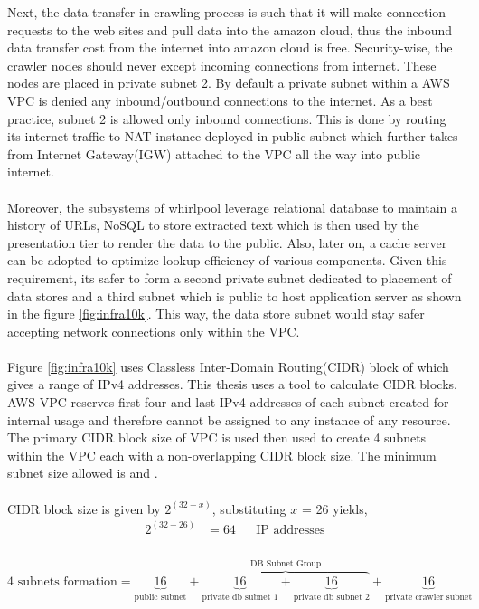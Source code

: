 \noindent
Next, the data transfer in crawling process is such that it will make connection requests to the web sites and pull data into the amazon cloud, thus the inbound data transfer cost from the internet into amazon cloud is free. Security-wise, the crawler nodes should never except incoming connections from internet. These nodes are placed in private subnet 2. By default a private subnet within a AWS VPC is denied any inbound/outbound connections to the internet. As a best practice, subnet 2 is allowed only inbound connections. This is done by routing its internet traffic to NAT instance deployed in public subnet which further takes from Internet Gateway(IGW) attached to the VPC all the way into public internet.
\\
\\
\noindent
Moreover, the subsystems of whirlpool leverage relational database to maintain a history of URLs, NoSQL to
store extracted text which is then used by the presentation tier to render the data to the public. Also,
later on, a cache server can be adopted to optimize lookup efficiency of various components. Given this
requirement, its safer to form a second private subnet dedicated to placement of data stores and a third
subnet which is public to host application server as shown in the figure \ref{fig:infra10k}. This way, the data store subnet would stay safer accepting network connections only within the VPC.
\\
\\
\noindent
Figure \ref{fig:infra10k} uses Classless Inter-Domain Routing(CIDR) block of  which
gives a range of  IPv4 addresses. This thesis uses a tool \cite{cidr} to calculate CIDR
blocks. AWS VPC reserves first four and last IPv4 addresses of each subnet created for internal usage and
therefore cannot be assigned to any instance of any resource. The primary CIDR block size of VPC is used
then used to create 4 subnets within the VPC each with a non-overlapping CIDR block size. The minimum
subnet size allowed is  and .
\\
\\
CIDR block size is given by $2^{(32 - x)}$, substituting $x$ = 26 yields,
\begin{align*}
  2^{(32 - 26)} &= 64 && \text{IP addresses} \\
\end{align*}
\\
\[
\text{4 subnets formation} = \underbrace{16}_\text{public subnet} + \overbrace{\underbrace{16}_\text{private db subnet 1} + \underbrace{16}_\text{private db subnet 2}}^\text{DB Subnet Group} + \underbrace{16}_\text{private crawler subnet} 
\]
